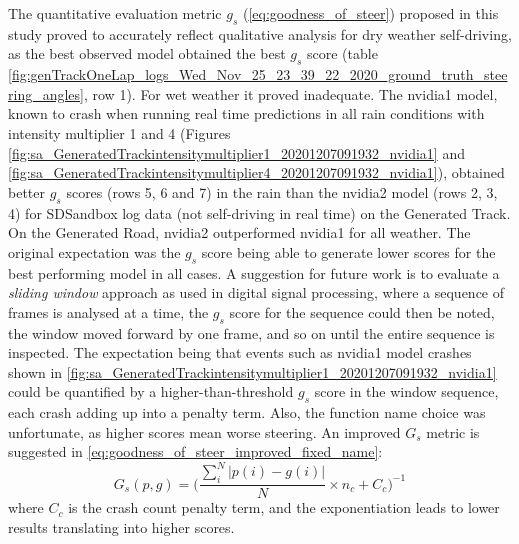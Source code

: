 The quantitative evaluation metric $g_s$ (\ref{eq:goodness_of_steer}) proposed in this study proved to accurately reflect qualitative analysis for dry weather self-driving, as the best observed model obtained the best $g_s$ score (table  \ref{fig:genTrackOneLap_logs_Wed_Nov_25_23_39_22_2020_ground_truth_steering_angles}, row 1). For wet weather it proved inadequate. 
The nvidia1 model, known to crash when running real time predictions in all rain conditions with intensity multiplier 1 and 4 (Figures
\ref{fig:sa_GeneratedTrackintensitymultiplier1_20201207091932_nvidia1} and  \ref{fig:sa_GeneratedTrackintensitymultiplier4_20201207091932_nvidia1}), obtained better $g_s$ scores (rows 5, 6 and 7) in the rain than the nvidia2 model (rows 2, 3, 4) for SDSandbox log data (not self-driving in real time) on the Generated Track. On the Generated Road, nvidia2 outperformed nvidia1 for all weather. The original expectation was the $g_s$ score being able to generate lower scores for the best performing model in all cases. A suggestion for future work is to evaluate a \textit{sliding window} approach as used in digital signal processing, where a sequence of frames is analysed at a time, the $g_s$ score for the sequence could then be noted, the window moved forward by one frame, and so on until the entire sequence is inspected. The expectation being that events such as nvidia1 model crashes shown in \ref{fig:sa_GeneratedTrackintensitymultiplier1_20201207091932_nvidia1} could be quantified by a higher-than-threshold $g_s$ score in the window sequence, each crash adding up into a penalty term. Also, the function name choice was unfortunate, as higher scores mean worse steering. An improved $G_s$ metric is suggested in \ref{eq:goodness_of_steer_improved_fixed_name}:
\begin{equation}
    \label{eq:goodness_of_steer_improved_fixed_name}
    G_s(p,g) = \Bigg(\frac{\sum_i^N \lvert p(i)-g(i) \rvert }{N} \times n_c + C_c\Bigg)^{-1}
\end{equation}
where $C_c$ is the crash count penalty term, and the exponentiation leads to lower results translating into higher scores.


